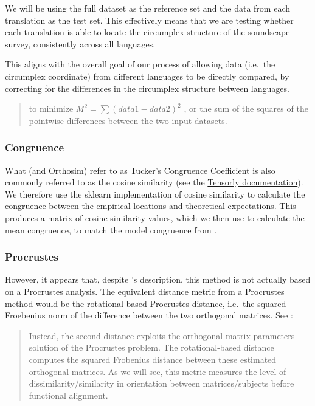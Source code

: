 \documentclass[
  authoryear,
  preprint,
  3p]{elsarticle}
\begin{document}
We will be using the full dataset as the reference set and the data from
each translation as the test set. This effectively means that we are
testing whether each translation is able to locate the circumplex
structure of the soundscape survey, consistently across all languages.

This aligns with the overall goal of our process of allowing data
(i.e.~the circumplex coordinate) from different languages to be directly
compared, by correcting for the differences in the circumplex structure
between languages.

\begin{quote}
to minimize \(M^2 = \sum (data1 - data2)^2\) , or the sum of the squares
of the pointwise differences between the two input datasets.
\end{quote}

\subsubsection{Congruence}\label{congruence}

What \citet{Rogoza2021three} (and Orthosim) refer to as Tucker's
Congruence Coefficient is also commonly referred to as the cosine
similarity (see the
\href{https://tensorly.org/stable/modules/generated/tensorly.metrics.factors.congruence_coefficient.html}{Tensorly
documentation}). We therefore use the sklearn implementation of cosine
similarity to calculate the congruence between the empirical locations
and theoretical expectations. This produces a matrix of cosine
similarity values, which we then use to calculate the mean congruence,
to match the model congruence from \citet{Rogoza2021three}.

\subsubsection{Procrustes}\label{procrustes}

However, it appears that, despite \citet{Rogoza2021three} 's
description, this method is not actually based on a Procrustes analysis.
The equivalent distance metric from a Procrustes method would be the
rotational-based Procrustes distance, i.e.~the squared Froebenius norm
of the difference between the two orthogonal matrices. See
\citet{Andreella2023Procrustes}:

\begin{quote}
Instead, the second distance exploits the orthogonal matrix parameters
solution of the Procrustes problem. The rotational-based distance
computes the squared Frobenius distance between these estimated
orthogonal matrices. As we will see, this metric measures the level of
dissimilarity/similarity in orientation between matrices/subjects before
functional alignment.
\end{quote}
\end{document}
